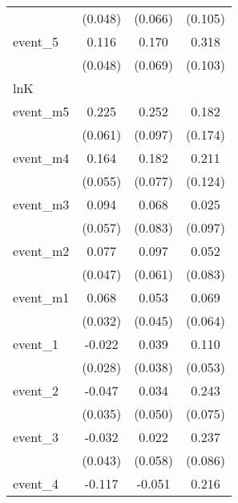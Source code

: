 {\begin{tabular}{l*{3}{c}}
            &     (0.048)         &     (0.066)         &     (0.105)         \\
[1em]
event\_5     &       0.116\sym{*}  &       0.170\sym{*}  &       0.318\sym{**} \\
            &     (0.048)         &     (0.069)         &     (0.103)         \\
\hline
lnK         &                     &                     &                     \\
event\_m5    &       0.225\sym{***}&       0.252\sym{**} &       0.182         \\
            &     (0.061)         &     (0.097)         &     (0.174)         \\
[1em]
event\_m4    &       0.164\sym{**} &       0.182\sym{*}  &       0.211         \\
            &     (0.055)         &     (0.077)         &     (0.124)         \\
[1em]
event\_m3    &       0.094         &       0.068         &       0.025         \\
            &     (0.057)         &     (0.083)         &     (0.097)         \\
[1em]
event\_m2    &       0.077         &       0.097         &       0.052         \\
            &     (0.047)         &     (0.061)         &     (0.083)         \\
[1em]
event\_m1    &       0.068\sym{*}  &       0.053         &       0.069         \\
            &     (0.032)         &     (0.045)         &     (0.064)         \\
[1em]
event\_1     &      -0.022         &       0.039         &       0.110\sym{*}  \\
            &     (0.028)         &     (0.038)         &     (0.053)         \\
[1em]
event\_2     &      -0.047         &       0.034         &       0.243\sym{**} \\
            &     (0.035)         &     (0.050)         &     (0.075)         \\
[1em]
event\_3     &      -0.032         &       0.022         &       0.237\sym{**} \\
            &     (0.043)         &     (0.058)         &     (0.086)         \\
[1em]
event\_4     &      -0.117         &      -0.051         &       0.216\sym{*}  \\

\end{tabular}}
